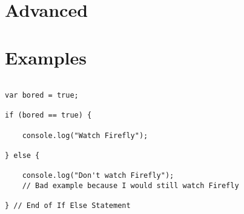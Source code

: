 \documentclass[12pt, letterpaper]{article}
\begin{document}
\section*{Advanced}



\section*{Examples}

\begin{lstlisting}

var bored = true;

if (bored == true) {

	console.log("Watch Firefly");

} else {

	console.log("Don't watch Firefly");
	// Bad example because I would still watch Firefly

} // End of If Else Statement

\end{lstlisting}
\end{document}

